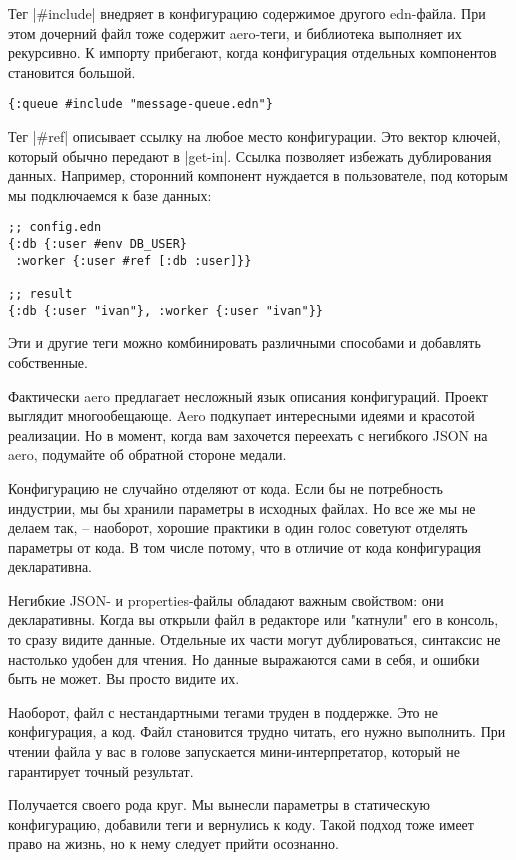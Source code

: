 Тег \spverb|#include| внедряет в конфигурацию содержимое другого edn-файла. При этом
дочерний файл тоже содержит aero-теги, и библиотека выполняет их рекурсивно. К
импорту прибегают, когда конфигурация отдельных компонентов становится большой.

\begin{verbatim}
{:queue #include "message-queue.edn"}
\end{verbatim}

Тег \spverb|#ref| описывает ссылку на любое место конфигурации. Это вектор ключей,
который обычно передают в \spverb|get-in|. Ссылка позволяет избежать дублирования
данных. Например, сторонний компонент нуждается в пользователе, под которым мы
подключаемся к базе данных:

\begin{verbatim}
;; config.edn
{:db {:user #env DB_USER}
 :worker {:user #ref [:db :user]}}

;; result
{:db {:user "ivan"}, :worker {:user "ivan"}}
\end{verbatim}

Эти и другие теги можно комбинировать различными способами и добавлять
собственные.

Фактически aero предлагает несложный язык описания конфигураций. Проект выглядит
многообещающе. Aero подкупает интересными идеями и красотой реализации. Но в
момент, когда вам захочется переехать с негибкого JSON на aero, подумайте об
обратной стороне медали.

Конфигурацию не случайно отделяют от кода. Если бы не потребность индустрии, мы
бы хранили параметры в исходных файлах. Но все же мы не делаем так, -- наоборот,
хорошие практики в один голос советуют отделять параметры от кода. В том числе
потому, что в отличие от кода конфигурация декларативна.

Негибкие JSON- и properties-файлы обладают важным свойством: они
декларативны. Когда вы открыли файл в редакторе или "катнули" его в консоль, то
сразу видите данные. Отдельные их части могут дублироваться, синтаксис не
настолько удобен для чтения. Но данные выражаются сами в себя, и ошибки быть не
может. Вы просто видите их.

Наоборот, файл с нестандартными тегами труден в поддержке. Это не конфигурация,
а код. Файл становится трудно читать, его нужно выполнить. При чтении файла у
вас в голове запускается мини-интерпретатор, который не гарантирует точный
результат.

Получается своего рода круг. Мы вынесли параметры в статическую конфигурацию,
добавили теги и вернулись к коду. Такой подход тоже имеет право на жизнь, но к
нему следует прийти осознанно.

